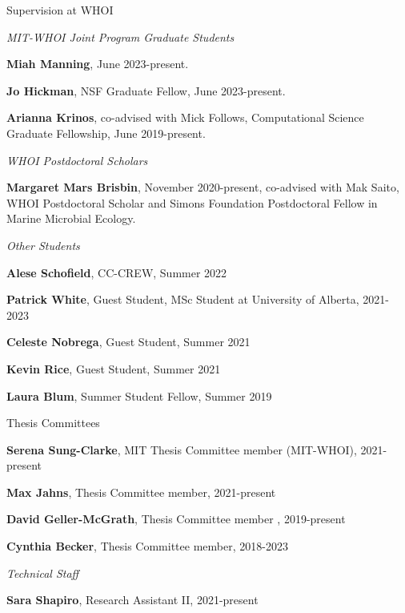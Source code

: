 \documentclass{resume}
\begin{document}
  \begin{rSection}{Supervision at WHOI}
  
      \begin{rSubsection}{\textit{MIT-WHOI Joint Program Graduate Students}}{}{}{}
          \item  {\textbf{Miah Manning}, June 2023-present.}
          \item  {\textbf{Jo Hickman}, NSF Graduate Fellow, June 2023-present.}
    \item  {\textbf{Arianna Krinos}, co-advised with Mick Follows, Computational Science Graduate Fellowship, June 2019-present.}
        \end{rSubsection}
      \begin{rSubsection}{\textit{WHOI Postdoctoral Scholars}}{}{}{}
    \item  {\textbf{Margaret Mars Brisbin}, November 2020-present, co-advised with Mak Saito, WHOI Postdoctoral Scholar and Simons Foundation Postdoctoral Fellow in Marine Microbial Ecology.}
        \end{rSubsection}
    \begin{rSubsection}{\textit{Other Students}}{}{}{}
    \item  {\textbf{Alese Schofield}, CC-CREW, Summer 2022}
    \item  {\textbf{Patrick White}, Guest Student, MSc Student at University of Alberta, 2021-2023}
    \item  {\textbf{Celeste Nobrega}, Guest Student, Summer 2021}
    \item  {\textbf{Kevin Rice}, Guest Student, Summer 2021}
    \item  {\textbf{Laura Blum}, Summer Student Fellow, Summer 2019}
        \end{rSubsection}
      \begin{rSubsection}{Thesis Committees}{}{}{}
     \item  {\textbf{Serena Sung-Clarke}, MIT Thesis Committee member (MIT-WHOI), 2021-present}
     \item  {\textbf{Max Jahns}, Thesis Committee member, 2021-present}
    \item  {\textbf{David Geller-McGrath}, Thesis Committee member , 2019-present}
    \item  {\textbf{Cynthia Becker}, Thesis Committee member, 2018-2023}
  \end{rSubsection}
      \begin{rSubsection}{\textit{Technical Staff}}{}{}{}
      \item{\textbf{Sara Shapiro}, Research Assistant II, 2021-present}
\end{rSubsection}
    
  \end{rSection}
  
\end{document}
